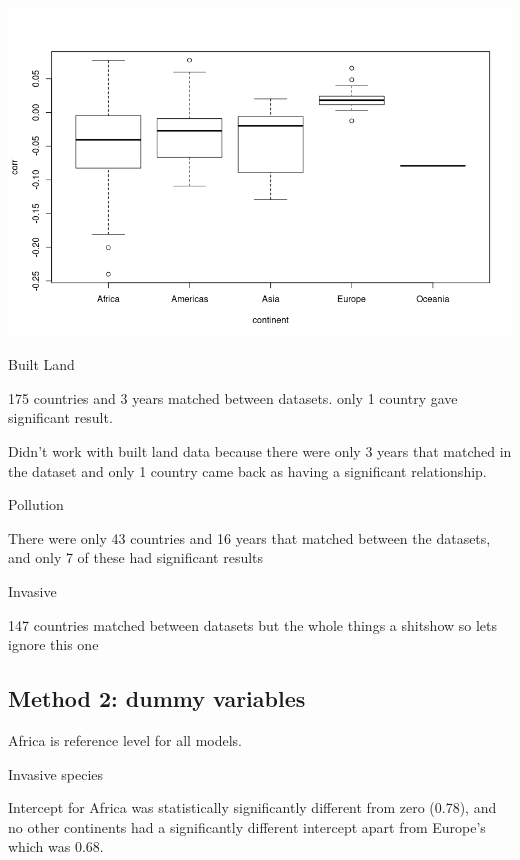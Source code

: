 \documentclass[11pt, a4paper, titlepage]{article}
\begin{document}
	\includegraphics[scale=0.75]{images/SensitivityScoresClimate.png}
	
	Built Land \newline
	
	175 countries and 3 years matched between datasets. only 1 country gave significant result.
	
	Didn't work with built land data because there were only 3 years that matched in the dataset and only 1 country came back as having a significant relationship. \newline
	
	Pollution \newline
	
	There were only 43 countries and 16 years that matched between the datasets, and only 7 of these had significant results \newline
	
	Invasive \newline
	
	147 countries matched between datasets but the whole things a shitshow so lets ignore this one
	
	
	
	
	 
	\subsection*{Method 2: dummy variables}
	 
	 Africa is reference level for all models. \newline

Invasive species \newline

Intercept for Africa was statistically significantly different from zero (0.78), and no other continents had a significantly different intercept apart from Europe's which was 0.68. 
\end{document}
